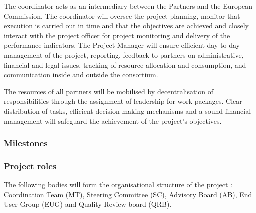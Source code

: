 The coordinator acts as an intermediary between the Partners and
the European Commission. The coordinator will oversee the project
planning, monitor that execution is carried out in time and that
the objectives are achieved and closely interact with the project
officer for project monitoring and delivery of the performance
indicators.  The Project Manager will ensure  efficient day-to-day
management of the project, reporting, feedback to partners on
administrative, financial and legal issues, tracking of  resource
allocation and consumption, and communication inside and outside the
consortium.

The resources of all partners will be mobilised by decentralisation of
responsibilities through the assignment of leadership for work
packages. Clear distribution of tasks, efficient decision making
mechanisms and a sound financial management will safeguard the
achievement of the project's objectives.

\subsubsection{Milestones}\label{sec:milestones}


\subsubsection{Project roles}

The following bodies will form the organisational structure of the
\TheProject project : Coordination Team (MT), Steering Committee (SC),
Advisory Board (AB), End User Group (EUG) and Quality Review board
(QRB).


